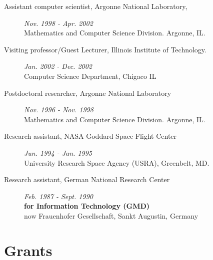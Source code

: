 \documentclass{article}
\begin{document}
\begin{description}
\item[ 	Assistant computer scientist, Argonne National Laboratory, ] \hfill {\it Nov. 1998 - Apr. 2002} ~\\
  Mathematics and Computer Science Division.  Argonne, IL.
    
\item[ 	Visiting professor/Guest Lecturer, Illinois Institute of Technology. ] \hfill {\it Jan. 2002 - Dec. 2002} ~\\
  Computer Science Department, Chigaco IL
  
\item[ 	Postdoctoral researcher,   Argonne National Laboratory ] \hfill {\it Nov. 1996 - Nov. 1998} ~\\
  Mathematics and Computer Science Division.  Argonne, IL.
  
\item[ 	Research assistant, NASA Goddard Space Flight Center] \hfill {\it Jun. 1994 - Jan. 1995} ~\\
  University Research Space Agency (USRA), Greenbelt, MD.

\item[ 	Research assistant, German National Research Center] \hfill {\it Feb. 1987 - Sept. 1990} ~\\
  {\bf  for Information Technology (GMD) } \\
  now Frauenhofer Gesellschaft, Sankt Augustin, Germany
  
\end{description}



\section{Grants}
\end{document}

